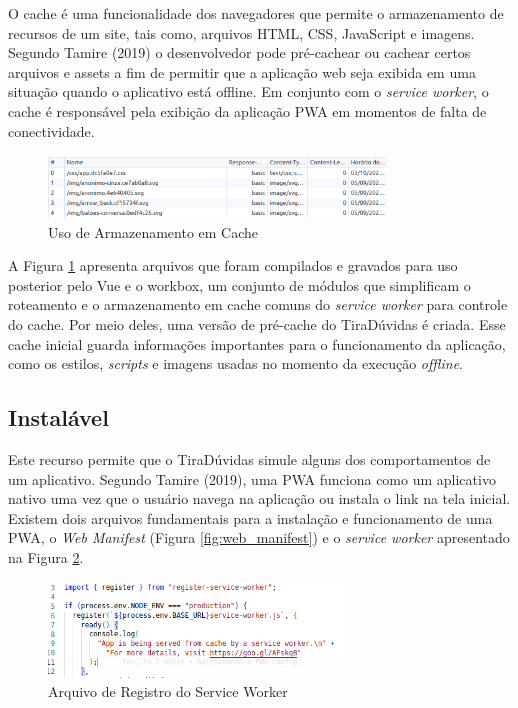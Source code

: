 \documentclass[12pt]{article}
\begin{document}
O cache é uma funcionalidade dos navegadores que permite o armazenamento de recursos de um site, tais como, arquivos HTML, CSS, JavaScript e imagens. Segundo Tamire (2019) o desenvolvedor pode pré-cachear ou cachear certos arquivos e assets a fim de permitir que a aplicação web seja exibida em uma situação quando o aplicativo está offline. Em conjunto com o \textit{service worker}, o cache é responsável pela exibição da aplicação PWA em momentos de falta de conectividade. 

\begin{figure}[ht!]
\centering
\includegraphics[width=0.8\textwidth]{imagens/cache.jpg}
\caption{Uso de Armazenamento em Cache}
\label{fig:cache}
\end{figure}

A Figura \ref{fig:cache} apresenta arquivos que foram compilados e gravados para uso posterior pelo Vue e o workbox, um conjunto de módulos que simplificam o roteamento e o armazenamento em cache comuns do \textit{service worker} para controle do cache. Por meio deles, uma versão de pré-cache do TiraDúvidas é criada. Esse cache inicial guarda informações importantes para o funcionamento da aplicação, como os estilos, \textit{scripts} e imagens usadas no momento da execução \textit{offline}.

\subsection{Instalável} \label{sec:instalavel}

Este recurso permite que o TiraDúvidas simule alguns dos comportamentos de um aplicativo. Segundo Tamire (2019), uma PWA funciona como um aplicativo nativo uma vez que o usuário navega na aplicação ou instala o link na tela inicial. Existem dois arquivos fundamentais para a instalação e funcionamento de uma PWA, o \textit{Web Manifest} (Figura \ref{fig:web_manifest}) e o \textit{service worker} apresentado na Figura \ref{fig:service_worker}.

\begin{figure}[ht!]
\centering
\includegraphics[width=0.7\textwidth]{imagens/service_worker.jpg}
\caption{Arquivo de Registro do Service Worker}
\label{fig:service_worker}
\end{figure}
\end{document}
